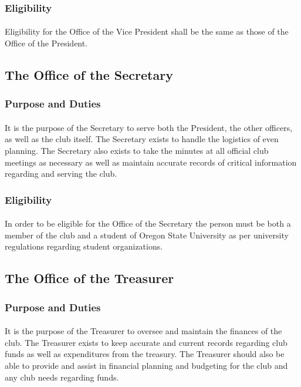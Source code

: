 \documentclass[12pt]{article}
\begin{document}
\subsubsection{Eligibility}
\paragraph{}
Eligibility for the Office of the Vice President shall be the same as those of the Office of the President.

\subsection{The Office of the Secretary}
\subsubsection{Purpose and Duties}
\paragraph{}
It is the purpose of the Secretary to serve both the President, the other officers, as well as the club itself. The Secretary exists to handle the logistics of even planning. The Secretary also exists
to take the minutes at all official club meetings as necessary as well as maintain accurate records of critical information regarding and serving the club.
\subsubsection{Eligibility}
\paragraph{}
In order to be eligible for the Office of the Secretary the person must be both a member of the club and a student of Oregon State University as per university regulations regarding student organizations.

\subsection{The Office of the Treasurer}
\subsubsection{Purpose and Duties}
\paragraph{}
It is the purpose of the Treasurer to oversee and maintain the finances of the club. The Treasurer exists to keep accurate and current records regarding club funds as well as expenditures from the treasury.
The Treasurer should also be able to provide and assist in financial planning and budgeting for the club and any club needs regarding funds.
\end{document}
